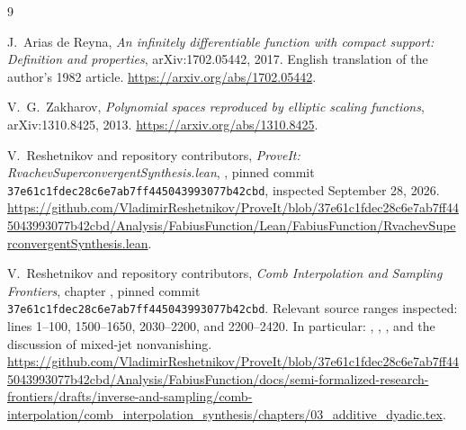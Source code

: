 \documentclass[11pt,a4paper]{article}
\numberwithin{equation}{section}
\theoremstyle{definition}
\theoremstyle{remark}
\newcommand{\snapshot}{\texttt{37e61c1fdec28c6e7ab7ff445043993077b42cbd}}
\begin{document}
\begin{thebibliography}{9}

J.~Arias de Reyna,
\emph{An infinitely differentiable function with compact support:
Definition and properties}, arXiv:1702.05442, 2017.
English translation of the author's 1982 article.
\url{https://arxiv.org/abs/1702.05442}.

V.~G.~Zakharov,
\emph{Polynomial spaces reproduced by elliptic scaling functions},
arXiv:1310.8425, 2013.
\url{https://arxiv.org/abs/1310.8425}.

V.~Reshetnikov and repository contributors,
\emph{ProveIt: RvachevSuperconvergentSynthesis.lean},
,
pinned commit \snapshot, inspected September 28, 2026.
\url{https://github.com/VladimirReshetnikov/ProveIt/blob/37e61c1fdec28c6e7ab7ff445043993077b42cbd/Analysis/FabiusFunction/Lean/FabiusFunction/RvachevSuperconvergentSynthesis.lean}.

V.~Reshetnikov and repository contributors,
\emph{Comb Interpolation and Sampling Frontiers}, chapter
, pinned commit \snapshot.
Relevant source ranges inspected: lines 1--100, 1500--1650,
2030--2200, and 2200--2420. In particular:
, ,
, and the discussion of mixed-jet nonvanishing.
\url{https://github.com/VladimirReshetnikov/ProveIt/blob/37e61c1fdec28c6e7ab7ff445043993077b42cbd/Analysis/FabiusFunction/docs/semi-formalized-research-frontiers/drafts/inverse-and-sampling/comb-interpolation/comb_interpolation_synthesis/chapters/03_additive_dyadic.tex}.

\end{thebibliography}
\end{document}
